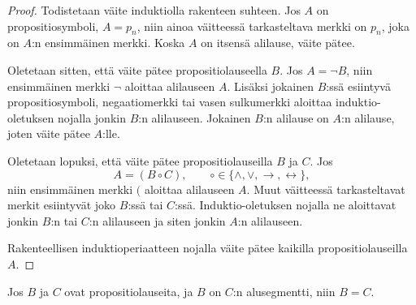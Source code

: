 \documentclass[11pt,a4paper]{amsart}
\begin{document}
\begin{proof}
Todistetaan väite induktiolla rakenteen suhteen. Jos \(A\) on propositiosymboli,
\(A = p_n\), niin ainoa väitteessä tarkasteltava merkki on \(p_n\), joka
on \(A\):n ensimmäinen merkki. Koska \(A\) on itsensä alilause, väite pätee.

Oletetaan sitten, että väite pätee propositiolauseella \(B\).
Jos \(A = \neg B\), niin ensimmäinen merkki \(\neg\) aloittaa alilauseen \(A\).
Lisäksi jokainen \(B\):ssä esiintyvä propositiosymboli, negaatiomerkki tai
vasen sulkumerkki aloittaa induktio-oletuksen nojalla jonkin \(B\):n alilauseen.
Jokainen \(B\):n alilause on \(A\):n alilause, joten väite pätee \(A\):lle.

Oletetaan lopuksi, että väite pätee propositiolauseilla \(B\) ja \(C\).
Jos
\[
A = (B \circ C), \qquad
\circ \in \{\land, \lor, \rightarrow, \leftrightarrow\},
\]
niin ensimmäinen merkki \((\) aloittaa alilauseen \(A\). Muut väitteessä
tarkasteltavat merkit esiintyvät joko \(B\):ssä tai \(C\):ssä.
Induktio-oletuksen nojalla ne aloittavat jonkin \(B\):n tai \(C\):n alilauseen
ja siten jonkin \(A\):n alilauseen.

Rakenteellisen induktioperiaatteen nojalla väite pätee kaikilla
propositiolauseilla \(A\).
\end{proof}

\begin{lemma}\label{lem:start-seg}
Jos \(B\) ja \(C\) ovat propositiolauseita, ja \(B\) on \(C\):n alusegmentti,
niin \(B = C\).
\end{lemma}
\end{document}
